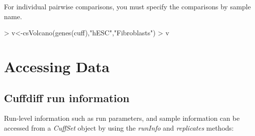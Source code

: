 \documentclass[10pt]{article}
\newcommand{\Rclass}[1]{{\textit{#1}}}
\newcommand{\Rmethod}[1]{{\textit{#1}}}
\begin{document}
For individual pairwise comparisons, you must specify the comparisons by sample
name.
\begin{Schunk}
\begin{Sinput}
> v<-csVolcano(genes(cuff),"hESC","Fibroblasts")
> v
\end{Sinput}
\end{Schunk}
\begin{figure}[htp]
	\begin{center}
	\end{center}
\end{figure}

\clearpage

\section{Accessing Data}

\subsection*{Cuffdiff run information}
Run-level information such as run parameters, and sample information can be accessed from a \Rclass{CuffSet} object by using the \Rmethod{runInfo} and \Rmethod{replicates} methods:
\end{document}
